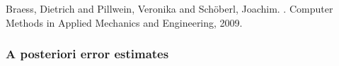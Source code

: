 \documentclass[10 pt]{beamer}
\begin{document}
\begin{frame}
\scriptsize{
\begin{thebibliography}{10}
Braess, Dietrich and Pillwein, Veronika and Sch{\"o}berl,
              Joachim.
.
\newblock Computer Methods in Applied Mechanics and Engineering, 2009.
\end{thebibliography}
}

\end{frame}
\begin{frame}
\frametitle{A posteriori error estimates}
\vspace{-0.2 cm}


\end{frame}
\end{document}
